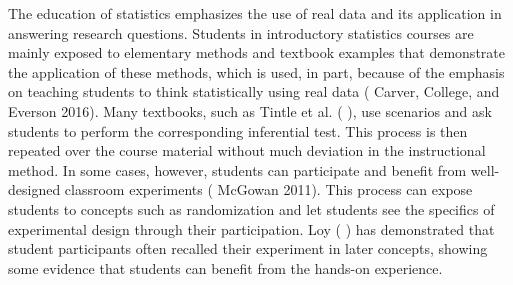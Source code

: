 \documentclass[
  12pt,
]{article}
\providecommand{\DIFdel}[1]{} %
\providecommand{\DIFadd}[1]{{\protect\color{blue} \sf #1}} %
\providecommand{\DIFdel}[1]{{\protect\color{red} [..\footnote{removed: #1} ]}} %
\providecommand{\DIFaddbegin}{} %
\providecommand{\DIFaddend}{} %
\providecommand{\DIFdelbegin}{} %
\providecommand{\DIFdelend}{} %
\newcommand{\DIFscaledelfig}{0.5}
\newlength{\DIFdelgraphicswidth} %
\newlength{\DIFdelgraphicsheight} %
\newcommand{\DIFaddincludegraphics}[2][]{{\color{blue}\fbox{\DIFOincludegraphics[#1]{#2}}}} %
\newcommand{\DIFdelincludegraphics}[2][]{%
\sbox{\DIFdelgraphicsbox}{\DIFOincludegraphics[#1]{#2}}%
\settoboxwidth{\DIFdelgraphicswidth}{\DIFdelgraphicsbox} %
\settoboxtotalheight{\DIFdelgraphicsheight}{\DIFdelgraphicsbox} %
\scalebox{\DIFscaledelfig}{%
\parbox[b]{\DIFdelgraphicswidth}{\usebox{\DIFdelgraphicsbox}\\[-\baselineskip] \rule{\DIFdelgraphicswidth}{0em}}\llap{\resizebox{\DIFdelgraphicswidth}{\DIFdelgraphicsheight}{%
\setlength{\unitlength}{\DIFdelgraphicswidth}%
\begin{picture}(1,1)%
\thicklines\linethickness{2pt} %
{\color[rgb]{1,0,0}\put(0,0){\framebox(1,1){}}}%
{\color[rgb]{1,0,0}\put(0,0){\line( 1,1){1}}}%
{\color[rgb]{1,0,0}\put(0,1){\line(1,-1){1}}}%
\end{picture}%
}\hspace*{3pt}}} %
} %
\DeclareRobustCommand{\DIFaddbegin}{\DIFOaddbegin \let\includegraphics\DIFaddincludegraphics} %
\DeclareRobustCommand{\DIFaddend}{\DIFOaddend \let\includegraphics\DIFOincludegraphics} %
\DeclareRobustCommand{\DIFdelbegin}{\DIFOdelbegin \let\includegraphics\DIFdelincludegraphics} %
\DeclareRobustCommand{\DIFdelend}{\DIFOaddend \let\includegraphics\DIFOincludegraphics} %
\begin{document}
The education of statistics emphasizes the use of real data and its
application in answering research questions. Students in introductory
statistics courses are mainly exposed to elementary methods and textbook
examples that demonstrate the application of these methods, which is
used, in part, because of the emphasis on teaching students to think
statistically using real data (\DIFdelbegin \DIFdel{\mbox{%
\citeproc{ref-carver}{Carver, College,
and Everson 2016}}\hskip0pt%
}\DIFdelend \DIFaddbegin \DIFadd{Carver, College, and Everson 2016}\DIFaddend ). Many
textbooks, such as Tintle et al. (\DIFdelbegin \DIFdel{\mbox{%
\citeproc{ref-Tintle2021}{2021}}\hskip0pt%
}\DIFdelend \DIFaddbegin \DIFadd{2021}\DIFaddend ), use scenarios and ask students
to perform the corresponding inferential test. This process is then
repeated over the course material without much deviation in the
instructional method. In some cases, however, students can participate
and benefit from well-designed classroom experiments (\DIFdelbegin \DIFdel{\mbox{%
\citeproc{ref-mcgowan2011}{McGowan 2011}}\hskip0pt%
}\DIFdelend \DIFaddbegin \DIFadd{McGowan 2011}\DIFaddend ).
This process can expose students to concepts such as randomization and
let students see the specifics of experimental design through their
participation. Loy (\DIFdelbegin \DIFdel{\mbox{%
\citeproc{ref-loy2021a}{2021}}\hskip0pt%
) have }\DIFdelend \DIFaddbegin \DIFadd{2021) has }\DIFaddend demonstrated that student participants
often recalled their experiment in later concepts, showing some evidence
that students can benefit from the hands-on experience.
\end{document}
